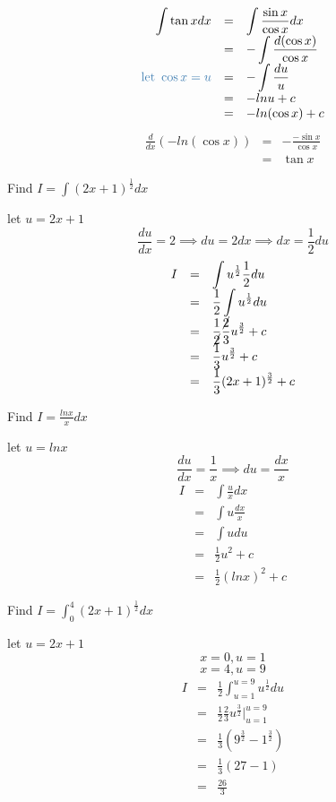 \begin{eg} 
$$\begin{array}{rcl}
\displaystyle \int \tan x dx & = & \displaystyle \int \frac{\sin x}{\cos x} dx\\
& = & \displaystyle -\int \frac{d(\cos x)}{\cos x}\\
\tssteelblue{\text{let } \cos x = u} & = & \displaystyle -\int \frac{du}{u}\\
& = & -ln u +c\\
& = & - ln(\cos x) + c
\end{array}$$
$$\begin{array}{rcl}
\displaystyle \frac{d}{dx} (-ln(\cos x)) & = & \displaystyle -\frac{- \sin x}{\cos x}\\
& = & \tan x
\end{array}$$
\end{eg}
\begin{eg}
Find $\displaystyle I = \int (2x+1)^\frac{1}{2} dx$

\soln
let $u = 2x +1$
$$\displaystyle \frac{du}{dx} = 2 \implies du = 2dx \implies dx = \frac{1}{2} du$$
$$\begin{array}{rcl}
I & = & \displaystyle \int u^{\frac{1}{2}} \frac{1}{2} du\\
& = & \displaystyle \frac{1}{2} \int u^{\frac{1}{2}}du\\
& = & \displaystyle \frac{1}{\cancel{2}} \frac{\cancel{2}}{3} u^{\frac{3}{2}} + c\\
& = & \displaystyle \frac{1}{3} u^{\frac{3}{2}} + c\\
& = & \displaystyle \frac{1}{3} (2x+1)^{\frac{3}{2}} + c
\end{array}$$
\end{eg}
\begin{eg}
Find $\displaystyle I = \frac{lnx}{x} dx$

\soln
let $u = ln x$
$$\displaystyle \frac{du}{dx} = \frac{1}{x}  \implies du = \frac{dx}{x}$$
$$\begin{array}{rcl}
I & = & \displaystyle \int \frac{u}{x} dx\\
& = & \displaystyle \int u \frac{dx}{x}\\
& = & \displaystyle \int u du\\
& = & \displaystyle \frac{1}{2}u^2 +c\\
& = & \displaystyle \frac{1}{2}(ln x)^2 +c
\end{array}$$
\end{eg}
\begin{eg}
Find $\displaystyle I = \int_0^4 (2x+1)^{\frac{1}{2}} dx$

\soln
let $u = 2x+1$
$$x = 0, u = 1$$
$$x = 4, u = 9$$
$$\begin{array}{rcl}
I & = & \displaystyle \frac{1}{2} \int_{u=1}^{u=9} u^{\frac{1}{2}}du\\
& = & \displaystyle \frac{1}{2} \frac{2}{3} u^{\frac{3}{2}} \Big|_{u=1}^{u=9}\\
& = & \displaystyle \frac{1}{3}(9^\frac{3}{2} - 1^{\frac{3}{2}})\\
& = & \displaystyle \frac{1}{3}(27-1)\\
& = & \displaystyle \frac{26}{3}
\end{array}$$
\end{eg}

